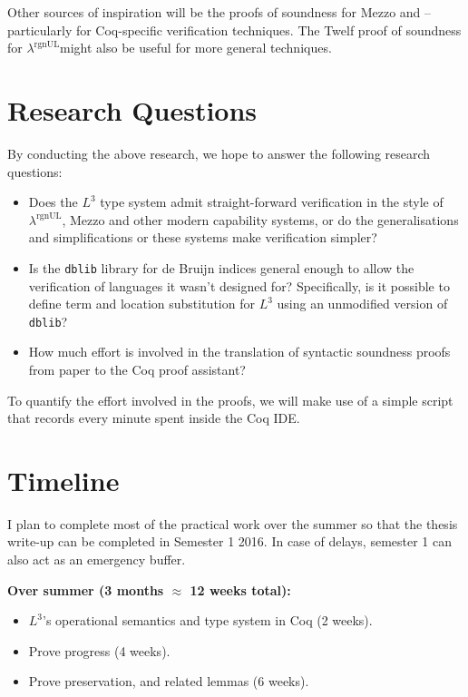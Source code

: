 \documentclass[]{unswthesis}
\newcommand{\rgnUL}{$\lambda^\text{rgnUL}$\text{ }}
\newcommand{\SSPHS}{\text{SSPHS }}
\let\c\texttt
\begin{document}
Other sources of inspiration will be the proofs of soundness for Mezzo and \SSPHS -- particularly for Coq-specific verification techniques. The Twelf proof of soundness for \rgnUL might also be useful for more general techniques.

\section{Research Questions}
\label{sec:research_questions}

By conducting the above research, we hope to answer the following research questions:

\begin{itemize}
\item Does the $L^3$ type system admit straight-forward verification in the style of \rgnUL, Mezzo and other modern capability systems, or do the generalisations and simplifications or these systems make verification simpler?
\item Is the \c{dblib} library for de Bruijn indices general enough to allow the verification of languages it wasn't designed for? Specifically, is it possible to define term and location substitution for $L^3$ using an unmodified version of \c{dblib}?
\item How much effort is involved in the translation of syntactic soundness proofs from paper to the Coq proof assistant?
\end{itemize}

To quantify the effort involved in the proofs, we will make use of a simple script that records every minute spent inside the Coq IDE.

\section{Timeline}
\label{sec:timeline}

I plan to complete most of the practical work over the summer so that the thesis write-up can be completed in Semester 1 2016. In case of delays, semester 1 can also act as an emergency buffer.

\textbf{Over summer (3 months $\approx$ 12 weeks total):}

\begin{itemize}
\item $L^3$'s operational semantics and type system in Coq (2 weeks).
\item Prove progress (4 weeks).
\item Prove preservation, and related lemmas (6 weeks).
\end{itemize}
\end{document}
